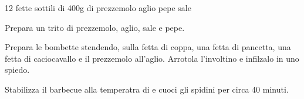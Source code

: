 \begin{ingreds}
	12 fette sottili di 
	400g di 
	prezzemolo
	aglio
	pepe
	sale

\end{ingreds}

\begin{method}
Prepara un trito di prezzemolo, aglio, sale e pepe.

Prepara le bombette stendendo, sulla fetta di coppa, una fetta di pancetta, una fetta di caciocavallo e il prezzemolo all'aglio. Arrotola l'involtino e infilzalo in uno spiedo.

Stabilizza il barbecue alla temperatra di  e cuoci gli spidini per circa 40 minuti.
\end {method}
